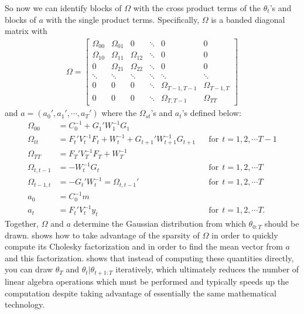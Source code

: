 \documentclass{article}
\begin{document}
So now we can identify blocks of $\Omega$ with the cross product terms of the $\theta_t$'s and blocks of $a$ with the single product terms. Specifically, $\Omega$ is a banded diagonal matrix with
\begin{align*}
  \Omega = \begin{bmatrix} \Omega_{00} & \Omega_{01} & 0 &\ddots & 0 & 0\\
    \Omega_{10} & \Omega_{11} & \Omega_{12} & \ddots  & 0            & 0\\
    0          & \Omega_{21} & \Omega_{22} & \ddots  & 0            & 0\\
    \ddots     & \ddots     & \ddots     & \ddots  & \ddots       & \ddots \\
    0          & 0          & 0          & \ddots  & \Omega_{T-1,T-1} & \Omega_{T-1,T}\\
    0          & 0          & 0          & \ddots  & \Omega_{T,T-1} & \Omega_{TT}\end{bmatrix}
\end{align*}
and $a = (a_0', a_1', \cdots, a_T')$ where the $\Omega_{st}$'s and $a_{t}$'s defined below:
\begin{align*}
  \Omega_{00} & = C_0^{-1} + G_1'W_1^{-1}G_1 && \\
  \Omega_{tt} & = F_t'V_t^{-1}F_t + W_t^{-1} + G_{t+1}'W_{t+1}^{-1}G_{t+1} &&  \mathrm{ for }\ \  t=1,2,\cdots T-1\\
  \Omega_{TT} & = F_T'V_T^{-1}F_T + W_T^{-1} && \\
  \Omega_{t,t-1} & = - W_t^{-1}G_t &&  \mathrm{ for }\ \  t=1,2,\cdots T\\
  \Omega_{t-1,t} & = - G_t'W_t^{-1} = \Omega_{t,t-1}' && \mathrm{ for }\ \  t=1,2,\cdots T\\
  a_0 & = C_0^{-1}m &&\\
  a_t &= F_t'V_t^{-1}y_t &&  \mathrm{ for }\ \  t=1,2,\cdots T.
\end{align*}
Together, $\Omega$ and $a$ determine the Gaussian distribution from which $\theta_{0:T}$ should be drawn.  shows how to take advantage of the sparsity of $\Omega$ in order to quickly compute its Cholesky factorization and in order to find the mean vector from $a$ and this factorization.  shows that instead of computing these quantities directly, you can draw $\theta_T$ and $\theta_t|\theta_{t+1:T}$ iteratively, which ultimately reduces the number of linear algebra operations which must be performed and typically speeds up the computation despite taking advantage of essentially the same mathematical technology.
\end{document}
